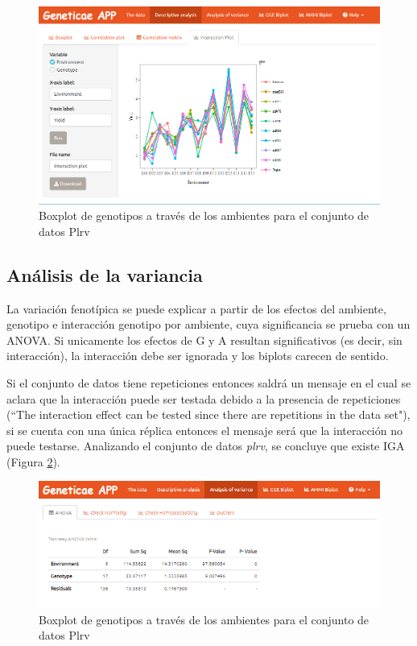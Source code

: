 \begin{figure}[H]
	\begin{center}
		\includegraphics[width=14cm]{./Graficos/int_plot.png}
	\end{center}
	\caption{Boxplot de genotipos a través de los ambientes para el conjunto de datos Plrv}
	\label{fig:fig49}
\end{figure}



\subsection{Análisis de la variancia}

La variación fenotípica se puede explicar a partir de los efectos del ambiente, genotipo e interacción genotipo por ambiente, cuya significancia se prueba con un ANOVA. Si unicamente los efectos de G y A resultan significativos (es decir, sin interacción), la interacción debe ser ignorada y los biplots carecen de sentido.

Si el conjunto de datos tiene repeticiones entonces saldrá un mensaje en el cual se aclara que la interacción puede ser testada debido a la presencia de repeticiones (``The interaction effect can be tested since there are repetitions in the data set"), si se cuenta con una única réplica entonces el mensaje será que la interacción no puede testarse. Analizando el conjunto de datos \emph{plrv}, se concluye que existe IGA (Figura \ref{fig:fig49}). 

\begin{figure}[H]
	\begin{center}
		\includegraphics[width=14cm]{./Graficos/ANOVA.png}
	\end{center}
	\caption{Boxplot de genotipos a través de los ambientes para el conjunto de datos Plrv}
	\label{fig:fig49}
\end{figure}



